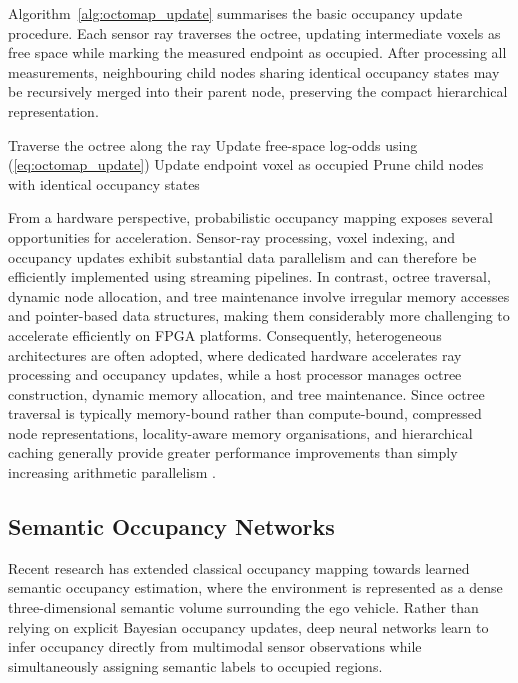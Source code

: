 Algorithm~\ref{alg:octomap_update} summarises the basic occupancy update procedure. Each sensor ray traverses the octree, updating intermediate voxels as free space while marking the measured endpoint as occupied. After processing all measurements, neighbouring child nodes sharing identical occupancy states may be recursively merged into their parent node, preserving the compact hierarchical representation.

\begin{algorithm}[t]
\caption{Incremental Probabilistic OctoMap Update}
\label{alg:octomap_update}
\begin{algorithmic}[1]
    \State Traverse the octree along the ray
        \State Update free-space log-odds using (\ref{eq:octomap_update})
    \EndFor
    \State Update endpoint voxel as occupied
\EndFor
\State Prune child nodes with identical occupancy states
\end{algorithmic}
\end{algorithm}

From a hardware perspective, probabilistic occupancy mapping exposes several opportunities for acceleration. Sensor-ray processing, voxel indexing, and occupancy updates exhibit substantial data parallelism and can therefore be efficiently implemented using streaming pipelines. In contrast, octree traversal, dynamic node allocation, and tree maintenance involve irregular memory accesses and pointer-based data structures, making them considerably more challenging to accelerate efficiently on FPGA platforms. Consequently, heterogeneous architectures are often adopted, where dedicated hardware accelerates ray processing and occupancy updates, while a host processor manages octree construction, dynamic memory allocation, and tree maintenance. Since octree traversal is typically memory-bound rather than compute-bound, compressed node representations, locality-aware memory organisations, and hierarchical caching generally provide greater performance improvements than simply increasing arithmetic parallelism \cite{jia2022_omu}.

\subsection{Semantic Occupancy Networks}

Recent research has extended classical occupancy mapping towards learned semantic occupancy estimation, where the environment is represented as a dense three-dimensional semantic volume surrounding the ego vehicle. Rather than relying on explicit Bayesian occupancy updates, deep neural networks learn to infer occupancy directly from multimodal sensor observations while simultaneously assigning semantic labels to occupied regions.

